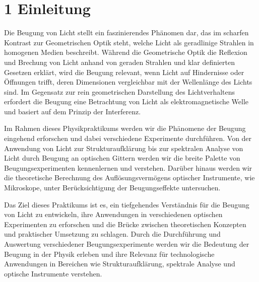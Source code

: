 \chapter*{1 Einleitung}
\setcounter{chapter}{1}
\setcounter{section}{0}
\setcounter{subsection}{0}

Die Beugung von Licht stellt ein faszinierendes Phänomen dar, das im scharfen Kontrast zur Geometrischen Optik steht, welche Licht als geradlinige Strahlen in homogenen Medien beschreibt. Während die Geometrische Optik die Reflexion und Brechung von Licht anhand von geraden Strahlen und klar definierten Gesetzen erklärt, wird die Beugung relevant, wenn Licht auf Hindernisse oder Öffnungen trifft, deren Dimensionen vergleichbar mit der Wellenlänge des Lichts sind. Im Gegensatz zur rein geometrischen Darstellung des Lichtverhaltens erfordert die Beugung eine Betrachtung von Licht als elektromagnetische Welle und basiert auf dem Prinzip der Interferenz.

Im Rahmen dieses Physikpraktikums werden wir die Phänomene der Beugung eingehend erforschen und dabei verschiedene Experimente durchführen. Von der Anwendung von Licht zur Strukturaufklärung bis zur spektralen Analyse von Licht durch Beugung an optischen Gittern werden wir die breite Palette von Beugungsexperimenten kennenlernen und verstehen. Darüber hinaus werden wir die theoretische Berechnung des Auflösungsvermögens optischer Instrumente, wie Mikroskope, unter Berücksichtigung der Beugungseffekte untersuchen.

Das Ziel dieses Praktikums ist es, ein tiefgehendes Verständnis für die Beugung von Licht zu entwickeln, ihre Anwendungen in verschiedenen optischen Experimenten zu erforschen und die Brücke zwischen theoretischen Konzepten und praktischer Umsetzung zu schlagen. Durch die Durchführung und Auswertung verschiedener Beugungsexperimente werden wir die Bedeutung der Beugung in der Physik erleben und ihre Relevanz für technologische Anwendungen in Bereichen wie Strukturaufklärung, spektrale Analyse und optische Instrumente verstehen.